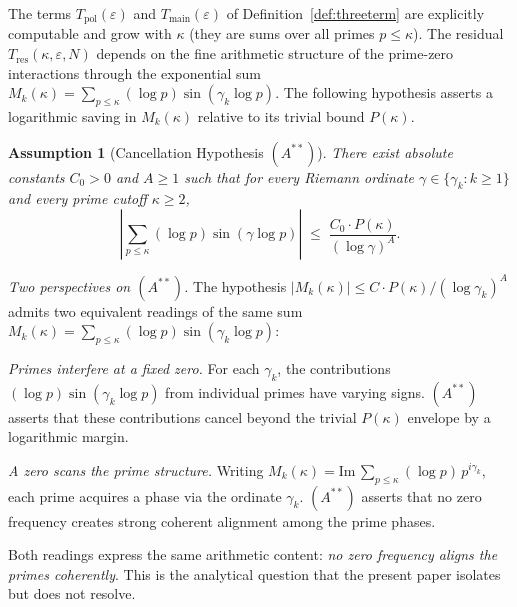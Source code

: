 \documentclass[11pt]{article}
\newtheorem{assumption}[theorem]{Assumption}
\newcommand{\Astar}{\ensuremath{(A^{**})}}  %
\begin{document}
The terms $T_{\mathrm{pol}}(\varepsilon)$ and $T_{\mathrm{main}}(\varepsilon)$
of Definition~\ref{def:threeterm}
are explicitly computable and grow with $\kappa$ (they are sums over
all primes $p\le\kappa$).
The residual $T_{\mathrm{res}}(\kappa,\varepsilon,N)$ depends on the fine arithmetic
structure of the prime-zero interactions through the exponential sum
$M_k(\kappa)=\sum_{p\le\kappa}(\log p)\sin(\gamma_k\log p)$.
The following hypothesis asserts a logarithmic saving in $M_k(\kappa)$
relative to its trivial bound $P(\kappa)$.

\begin{assumption}[Cancellation Hypothesis \Astar]
\label{ass:cancel}
There exist absolute constants $C_0>0$ and $A\ge 1$ such that
for every Riemann ordinate $\gamma\in\{\gamma_k:k\ge 1\}$ and every
prime cutoff $\kappa\ge 2$,
\[
\left|\sum_{p\le\kappa}(\log p)\sin(\gamma\log p)\right|
  \;\le\; \frac{C_0\cdot P(\kappa)}{(\log\gamma)^A}.
\]
\end{assumption}

\smallskip
\noindent\emph{Two perspectives on $(A^{**})$.}
The hypothesis $|M_k(\kappa)|\le C\cdot P(\kappa)/(\log\gamma_k)^A$
admits two equivalent readings of the same sum
$M_k(\kappa)=\sum_{p\le\kappa}(\log p)\sin(\gamma_k\log p)$:

\smallskip
\noindent\emph{Primes interfere at a fixed zero.}
For each $\gamma_k$, the contributions $(\log p)\sin(\gamma_k\log p)$
from individual primes have varying signs.
$(A^{**})$ asserts that these contributions cancel beyond the
trivial $P(\kappa)$ envelope by a logarithmic margin.

\smallskip
\noindent\emph{A zero scans the prime structure.}
Writing $M_k(\kappa)=\mathrm{Im}\,\sum_{p\le\kappa}(\log p)\,p^{i\gamma_k}$,
each prime acquires a phase via the ordinate $\gamma_k$.
$(A^{**})$ asserts that no zero frequency creates strong coherent
alignment among the prime phases.

\smallskip
Both readings express the same arithmetic content:
\emph{no zero frequency aligns the primes coherently}.
This is the analytical question that the present paper isolates
but does not resolve.
\end{document}
